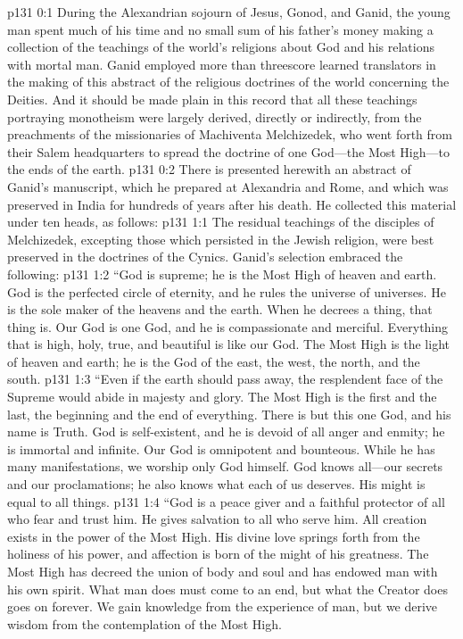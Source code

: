 \author{Midwayer Commission}
\vs p131 0:1 During the Alexandrian sojourn of Jesus, Gonod, and Ganid, the young man spent much of his time and no small sum of his father’s money making a collection of the teachings of the world’s religions about God and his relations with mortal man. Ganid employed more than threescore learned translators in the making of this abstract of the religious doctrines of the world concerning the Deities. And it should be made plain in this record that all these teachings portraying monotheism were largely derived, directly or indirectly, from the preachments of the missionaries of Machiventa Melchizedek, who went forth from their Salem headquarters to spread the doctrine of one God---the Most High---to the ends of the earth.\plusone
\vs p131 0:2 There is presented herewith an abstract of Ganid’s manuscript, which he prepared at Alexandria and Rome, and which was preserved in India for hundreds of years after his death. He collected this material under ten heads, as follows:
\vs p131 1:1 The residual teachings of the disciples of Melchizedek, excepting those which persisted in the Jewish religion, were best preserved in the doctrines of the Cynics. Ganid’s selection embraced the following:
\pc \vs p131 1:2 “God is supreme; he is the Most High of heaven and earth. God is the perfected circle of eternity, and he rules the universe of universes. He is the sole maker of the heavens and the earth. When he decrees a thing, that thing is. Our God is one God, and he is compassionate and merciful. Everything that is high, holy, true, and beautiful is like our God. The Most High is the light of heaven and earth; he is the God of the east, the west, the north, and the south.
\vs p131 1:3 “Even if the earth should pass away, the resplendent face of the Supreme would abide in majesty and glory. The Most High is the first and the last, the beginning and the end of everything. There is but this one God, and his name is Truth. God is self\hyp{}existent, and he is devoid of all anger and enmity; he is immortal and infinite. Our God is omnipotent and bounteous. While he has many manifestations, we worship only God himself. God knows all---our secrets and our proclamations; he also knows what each of us deserves. His might is equal to all things.\plusone
\vs p131 1:4 “God is a peace giver and a faithful protector of all who fear and trust him. He gives salvation to all who serve him. All creation exists in the power of the Most High. His divine love springs forth from the holiness of his power, and affection is born of the might of his greatness. The Most High has decreed the union of body and soul and has endowed man with his own spirit. What man does must come to an end, but what the Creator does goes on forever. We gain knowledge from the experience of man, but we derive wisdom from the contemplation of the Most High.
